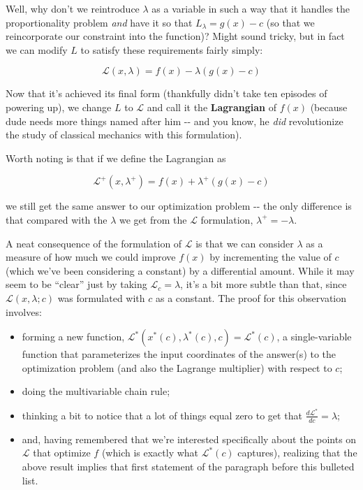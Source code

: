 \documentclass[letterpaper,12pt]{report}
\providecommand{\tightlist}{%
  \setlength{\itemsep}{0pt}\setlength{\parskip}{0pt}}
\begin{document}
Well, why don't we reintroduce \(\lambda\) as a variable in such a way
that it handles the proportionality problem \emph{and} have it so that
\(L_{\lambda} = g(x) - c\) (so that we reincorporate our constraint into
the function)? Might sound tricky, but in fact we can modify \(L\) to
satisfy these requirements fairly simply:

\[ \mathcal{L}(x, \lambda) = f(x) - \lambda \left(g(x) - c\right) \]

Now that it's achieved its final form (thankfully didn't take ten
episodes of powering up), we change \(L\) to \(\mathcal{L}\) and call it
the \textbf{Lagrangian} 
of \(f(x)\) (because dude needs more things
named after him -\/- and you know, he \emph{did} revolutionize the study
of classical mechanics with this formulation).

Worth noting is that if we define the Lagrangian as

\[ \mathcal{L^+}(x, \lambda ^+) = f(x) + \lambda^+\left(g(x) - c\right) \]

we still get the same answer to our optimization problem -\/- the only
difference is that compared with the \(\lambda\) we get from the
\(\mathcal{L}\) formulation, \(\lambda ^+ = - \lambda\).

A neat consequence of the formulation of \(\mathcal{L}\) is that we can
consider \(\lambda\) as a measure of how much we could improve \(f(x)\)
by incrementing the value of \(c\) (which we've been considering a
constant) by a differential amount. While it may seem to be ``clear'' just
by taking \(\mathcal{L}_c = \lambda\), it's a bit more subtle than that,
since \(\mathcal{L}(x, \lambda; c)\) was formulated with \(c\) as a
constant. The proof for this observation involves:

\begin{itemize}
\tightlist
\item
  forming a new function,
  \(\mathcal{L}^*(x^*(c), \lambda ^*(c), c) = \mathcal{L}^*(c)\), a
  single-variable function that parameterizes the input coordinates of
  the answer(s) to the optimization problem (and also the Lagrange
  multiplier) with respect to \(c\);
\item
  doing the multivariable chain rule;
\item
  thinking a bit to notice that a lot of things equal zero to get that
  \(\frac{d\mathcal{L}^*}{dc} = \lambda \);
\item
  and, having remembered that we're interested specifically about the
  points on \(\mathcal{L}\) that optimize \(f\) (which is exactly what
  \(\mathcal{L}^*(c)\) captures), realizing that the above result
  implies that first statement of the paragraph before this bulleted
  list.
\end{itemize}
\end{document}
